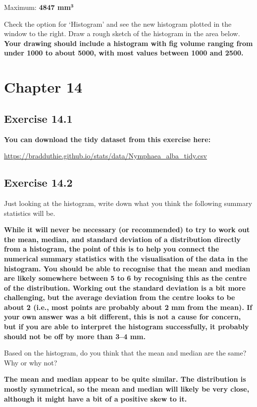 \documentclass[
  openany]{krantz}
\begin{document}
Maximum: \textbf{4847 mm\(\mathbf{^3}\)}

Check the option for `Histogram' and see the new histogram plotted in the window to the
right. Draw a rough sketch of the histogram in the area below. \textbf{Your drawing should include a histogram with fig volume ranging from under 1000 to about 5000, with most values between 1000 and 2500.}

\hypertarget{chapter-14}{%
\section{Chapter 14}\label{chapter-14}}

\hypertarget{exercise-14.1}{%
\subsection{Exercise 14.1}\label{exercise-14.1}}

\textbf{You can download the tidy dataset from this exercise here:}

\url{https://bradduthie.github.io/stats/data/Nymphaea_alba_tidy.csv}

\hypertarget{exercise-14.2}{%
\subsection{Exercise 14.2}\label{exercise-14.2}}

Just looking at the histogram, write down what you think the following summary statistics will be.

\textbf{While it will never be necessary (or recommended) to try to work out the mean, median, and standard deviation of a distribution directly from a histogram, the point of this is to help you connect the numerical summary statistics with the visualisation of the data in the histogram. You should be able to recognise that the mean and median are likely somewhere between 5 to 6 by recognising this as the centre of the distribution. Working out the standard deviation is a bit more challenging, but the average deviation from the centre looks to be about 2 (i.e., most points are probably about 2 mm from the mean). If your own answer was a bit different, this is not a cause for concern, but if you are able to interpret the histogram successfully, it probably should not be off by more than 3--4 mm.}

Based on the histogram, do you think that the mean and median are the same? Why or why
not?

\textbf{The mean and median appear to be quite similar. The distribution is mostly symmetrical, so the mean and median will likely be very close, although it might have a bit of a positive skew to it.}
\end{document}
